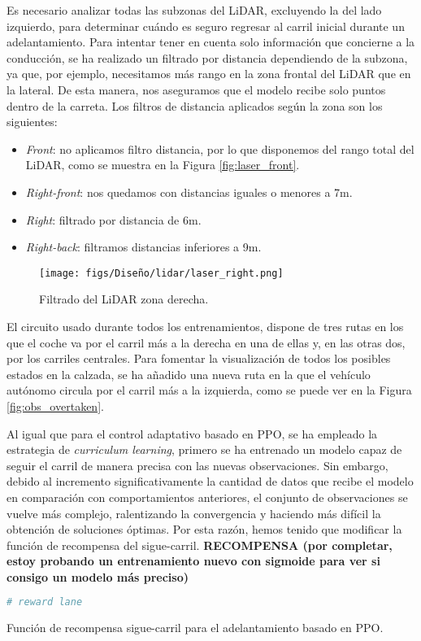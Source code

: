 Es necesario analizar todas las subzonas del \ac{LiDAR}, excluyendo la del lado izquierdo, para determinar cuándo es seguro regresar al carril inicial durante un adelantamiento. Para intentar tener en cuenta solo información que concierne a la conducción, se ha realizado un filtrado por distancia dependiendo de la subzona, ya que, por ejemplo, necesitamos más rango en la zona frontal del \ac{LiDAR} que en la lateral. De esta manera, nos aseguramos que el modelo recibe solo puntos dentro de la carreta. Los filtros de distancia aplicados según la zona son los siguientes:
\begin{itemize}
\item \textit{Front}: no aplicamos filtro distancia, por lo que disponemos del rango total del \ac{LiDAR}, como se muestra en la Figura \ref{fig:laser_front}.
\item \textit{Right-front}: nos quedamos con distancias iguales o menores a 7m.
\item \textit{Right}: filtrado por distancia de 6m.
\item \textit{Right-back}: filtramos distancias inferiores a 9m.
\end{itemize}

\begin{figure}[ht]
\centering
\texttt{[image: figs/Diseño/lidar/laser\_right.png]}
\caption{Filtrado del \ac{LiDAR} zona derecha.}
\label{fig:laser_right}
\end{figure}

El circuito usado durante todos los entrenamientos, dispone de tres rutas en los que el coche va por el carril más a la derecha en una de ellas y, en las otras dos, por los carriles centrales. Para fomentar la visualización de todos los posibles estados en la calzada, se ha añadido una nueva ruta en la que el vehículo autónomo circula por el carril más a la izquierda, como se puede ver en la Figura \ref{fig:obs_overtaken}.

Al igual que para el control adaptativo basado en \ac{PPO}, se ha empleado la estrategia de \textit{curriculum learning}, primero se ha entrenado un modelo capaz de seguir el carril de manera precisa con las nuevas observaciones. Sin embargo, debido al incremento significativamente la cantidad de datos que recibe el modelo en comparación con comportamientos anteriores, el conjunto de observaciones se vuelve más complejo, ralentizando la convergencia y haciendo más difícil la obtención de soluciones óptimas. Por esta razón, hemos tenido que modificar la función de recompensa del sigue-carril. \textbf{ RECOMPENSA (por completar, estoy probando un entrenamiento nuevo con sigmoide para ver si consigo un modelo más preciso)}
\begin{code}[h]
\begin{lstlisting}[language=Python]
# reward lane
\end{lstlisting}
\caption[Función de recompensa sigue-carril para el adelantamiento basado en \ac{PPO}]{Función de recompensa sigue-carril para el adelantamiento basado en \ac{PPO}.}
\label{cod:rew_ppo_lane_overtaken}
\end{code}


